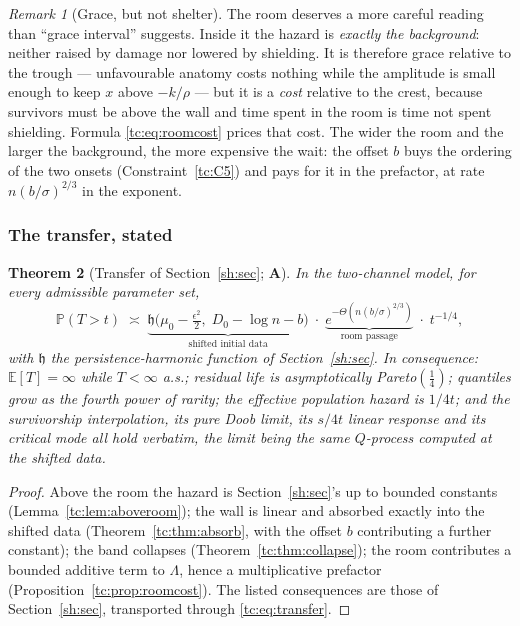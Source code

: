 \documentclass[11pt]{article}
\numberwithin{equation}{section}
\theoremstyle{plain}
\newtheorem{theorem}{Theorem}[section]
\theoremstyle{definition}
\theoremstyle{remark}
\newtheorem{remark}[theorem]{Remark}
\newcommand{\E}{\mathbb{E}}
\newcommand{\PP}{\mathbb{P}}
\newcommand{\hm}{\mathfrak{h}}
\begin{document}
\begin{remark}[Grace, but not shelter]\label{tc:rem:notshelter}
The room deserves a more careful reading than ``grace interval''
suggests. Inside it the hazard is \emph{exactly the background}: neither
raised by damage nor lowered by shielding. It is therefore grace
relative to the trough --- unfavourable anatomy costs nothing while the
amplitude is small enough to keep $x$ above $-k/\rho$ --- but it is a
\emph{cost} relative to the crest, because survivors must be above the
wall and time spent in the room is time not spent shielding. Formula
\eqref{tc:eq:roomcost} prices that cost. The wider the room and the
larger the background, the more expensive the wait: the offset $b$ buys
the ordering of the two onsets (Constraint~\ref{tc:C5}) and pays for it
in the prefactor, at rate $n(b/\sigma)^{2/3}$ in the exponent.
\end{remark}

\subsubsection{The transfer, stated}\label{tc:subsub:transferstated}

\begin{theorem}[Transfer of Section~\ref{sh:sec}; \textbf{A}]
\label{tc:thm:transfer}
In the two-channel model, for every admissible parameter set,
\begin{equation}\label{tc:eq:transfer}
\PP(T>t)\;\asymp\;\underbrace{\hm\bigl(\mu_{0}-\tfrac{\epsilon^{2}}{2},
\;D_{0}-\log n-b\bigr)}_{\text{shifted initial data}}\;\cdot\;
\underbrace{e^{-\Theta\left(n(b/\sigma)^{2/3}\right)}}_{\text{room
passage}}\;\cdot\;t^{-1/4},
\end{equation}
with $\hm$ the persistence-harmonic function of Section~\ref{sh:sec}. In
consequence: $\E[T]=\infty$ while $T<\infty$ a.s.; residual life is
asymptotically Pareto$(\tfrac14)$; quantiles grow as the fourth power of
rarity; the effective population hazard is $1/4t$; and the survivorship
interpolation, its pure Doob limit, its $s/4t$ linear response and its
critical mode all hold verbatim, the limit being the same $Q$-process
computed at the shifted data.
\end{theorem}

\begin{proof}
Above the room the hazard is Section~\ref{sh:sec}'s up to bounded constants
(Lemma~\ref{tc:lem:aboveroom}); the wall is linear and absorbed exactly
into the shifted data (Theorem~\ref{tc:thm:absorb}, with the offset $b$
contributing a further constant); the band collapses
(Theorem~\ref{tc:thm:collapse}); the room contributes a bounded additive
term to $\Lambda$, hence a multiplicative prefactor
(Proposition~\ref{tc:prop:roomcost}). The listed consequences are those
of Section~\ref{sh:sec}, transported through
\eqref{tc:eq:transfer}.
\end{proof}
\end{document}
